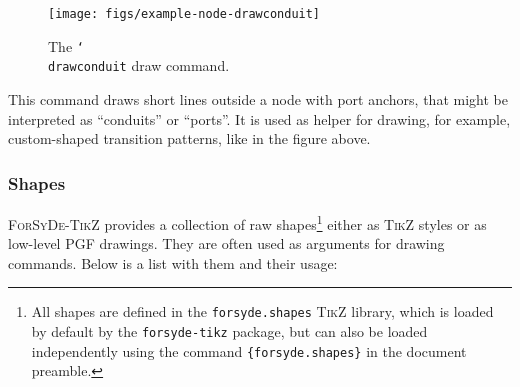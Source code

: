 % 



\begin{figure}[htb]\centering
\texttt{[image: figs/example-node-drawconduit]}

\caption{The \texttt{\char`\\drawconduit} draw command.}
\end{figure}
\hspace{1pt}

\noindent This command draws short lines outside a node with port anchors, that might be interpreted as ``conduits'' or ``ports''. It is used as helper for drawing, for example, custom-shaped transition patterns, like in the figure above.

\subsubsection{Shapes}
\label{sec:provided-shapes}
\textsc{ForSyDe-TikZ} provides a collection of raw shapes\footnote{All shapes are defined in the \texttt{forsyde.shapes} \textsc{TikZ} library, which is loaded by default by the \texttt{forsyde-tikz} package, but can also be loaded independently using the command \texttt{\string\usetikzlibrary\{forsyde.shapes\}} in the document preamble.} either as \textsc{TikZ} styles or as low-level \textsc{PGF} drawings. They are often used as arguments for drawing commands. Below is a list with them and their usage:


